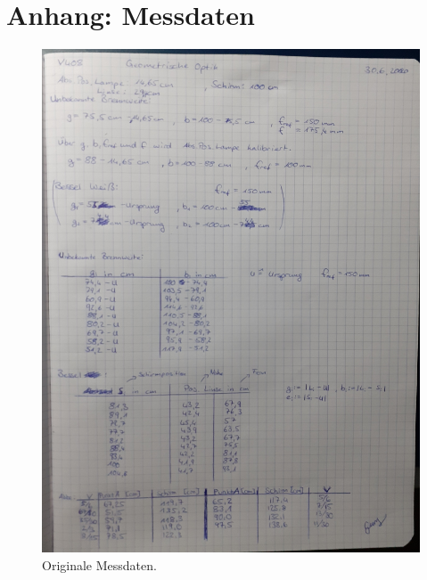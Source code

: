 \newpage
\section*{Anhang: Messdaten}

\begin{figure}
    \centering
    \includegraphics[width=.9\textwidth,angle=-90]{plots/geomOptik_anhang.jpg}
    \caption{Originale Messdaten.}
    \label{fig:anhang}
\end{figure}